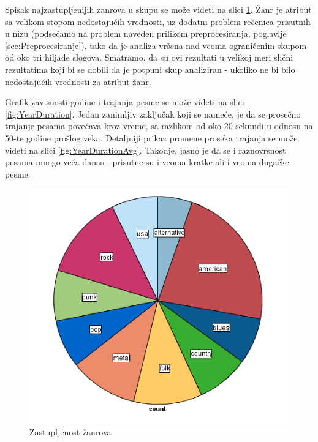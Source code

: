 Spisak najzastupljenijih zanrova u skupu se mo\v{z}e videti na slici \ref{fig:ZastupljenostZanrova}. \v{Z}anr je atribut sa velikom stopom nedostaju\'c{}ih vrednosti, uz dodatni problem re\v{c}enica prisutnih u nizu (podse\'c{}amo na problem naveden prilikom preprocesiranja, poglavlje \ref{sec:Preprocesiranje}), tako da je analiza vr\v{s}ena nad veoma ograni\v{c}enim skupom od oko tri hiljade slogova. Smatramo, da su ovi rezultati u velikoj meri sli\v{c}ni rezultatima koji bi se dobili da je potpuni skup analiziran - ukoliko ne bi bilo nedostaju\'c{}ih vrednosti za atribut \v{z}anr.

Grafik zavisnosti godine i trajanja pesme se mo\v{z}e videti na slici \ref{fig:YearDuration}. Jedan zanimljiv zaklju\v{c}ak koji se name\'c{}e, je da se prose\v{c}no trajanje pesama pove\'c{}ava kroz vreme, sa razlikom od oko 20 sekundi u odnosu na 50-te godine pro\v{s}log veka. Detaljniji prikaz promene proseka trajanja se mo\v{z}e videti na slici \ref{fig:YearDurationAvg}. Takodje, jasno je da se i raznovrsnost pesama mnogo ve\'c{}a danas - prisutne su i veoma kratke ali i veoma duga\v{c}ke pesme.

\begin{figure}[H]
    \centering
    \includegraphics[scale=0.5]{resources/ZastupljenostZanrova.png}
    \caption{Zastupljenost \v{z}anrova}
    \label{fig:ZastupljenostZanrova}
\end{figure}

